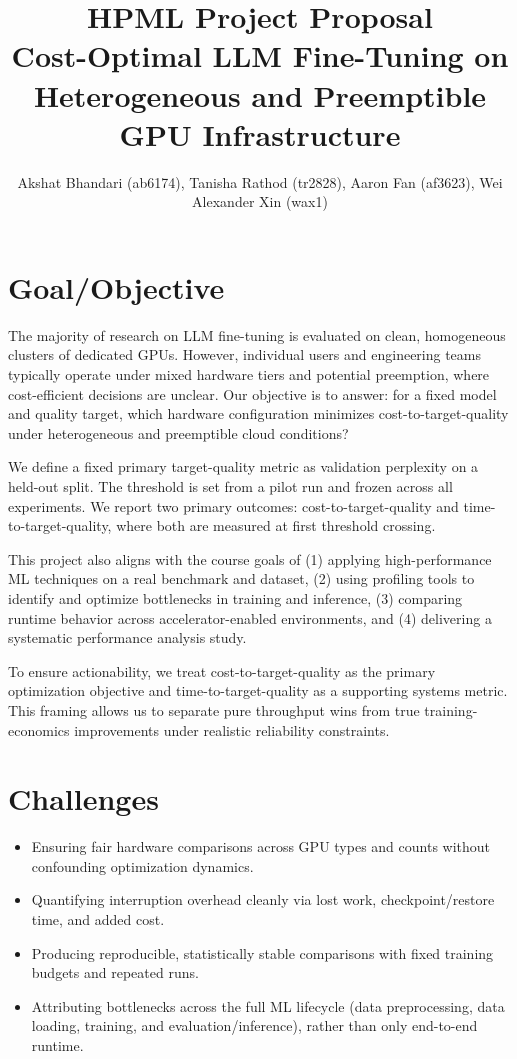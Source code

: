 \documentclass[10pt]{article}
\title{HPML Project Proposal \\ Cost-Optimal LLM Fine-Tuning on Heterogeneous and Preemptible GPU Infrastructure}
\author{Akshat Bhandari (ab6174), Tanisha Rathod (tr2828), Aaron Fan (af3623), Wei Alexander Xin (wax1)}
\date{}
\begin{document}
\maketitle
\vspace{-8pt}

\section{Goal/Objective}
The majority of research on LLM fine-tuning is evaluated on clean, homogeneous clusters of dedicated GPUs. However, individual users and engineering teams typically operate under mixed hardware tiers and potential preemption, where cost-efficient decisions are unclear. Our objective is to answer: for a fixed model and quality target, which hardware configuration minimizes cost-to-target-quality under heterogeneous and preemptible cloud conditions?

We define a fixed primary target-quality metric as validation perplexity on a held-out split. The threshold is set from a pilot run and frozen across all experiments. We report two primary outcomes: cost-to-target-quality and time-to-target-quality, where both are measured at first threshold crossing.

This project also aligns with the course goals of (1) applying high-performance ML techniques on a real benchmark and dataset, (2) using profiling tools to identify and optimize bottlenecks in training and inference, (3) comparing runtime behavior across accelerator-enabled environments, and (4) delivering a systematic performance analysis study.

To ensure actionability, we treat cost-to-target-quality as the primary optimization objective and time-to-target-quality as a supporting systems metric. This framing allows us to separate pure throughput wins from true training-economics improvements under realistic reliability constraints.

\section{Challenges}
\begin{itemize}
  \item Ensuring fair hardware comparisons across GPU types and counts without confounding optimization dynamics.
  \item Quantifying interruption overhead cleanly via lost work, checkpoint/restore time, and added cost.
  \item Producing reproducible, statistically stable comparisons with fixed training budgets and repeated runs.
  \item Attributing bottlenecks across the full ML lifecycle (data preprocessing, data loading, training, and evaluation/inference), rather than only end-to-end runtime.
\end{itemize}
\end{document}
